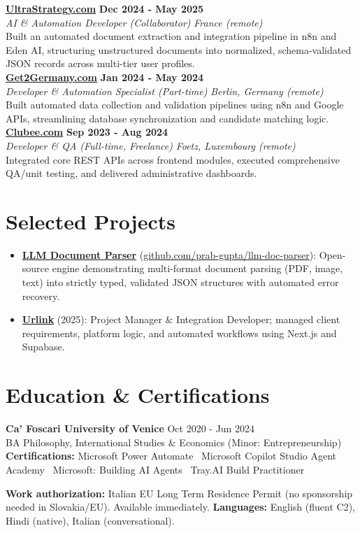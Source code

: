 \documentclass[a4paper,10pt]{article}
\newcommand{\role}[4]{%
  \textbf{#1} \hfill \textbf{#2}\\[1pt]%
  \textit{#3} \hfill \textit{#4}\\[2pt]%
}
\begin{document}
\role{\href{https://ultrastrategy.com}{UltraStrategy.com}}{Dec 2024 - May 2025}{AI \& Automation Developer (Collaborator)}{France (remote)}
Built an automated document extraction and integration pipeline in n8n and Eden AI, structuring unstructured documents into normalized, schema-validated JSON records across multi-tier user profiles.\\[1pt]

\role{\href{https://get2germany.com}{Get2Germany.com}}{Jan 2024 - May 2024}{Developer \& Automation Specialist (Part-time)}{Berlin, Germany (remote)}
Built automated data collection and validation pipelines using n8n and Google APIs, streamlining database synchronization and candidate matching logic.\\[1pt]

\role{\href{https://clubee.com}{Clubee.com}}{Sep 2023 - Aug 2024}{Developer \& QA (Full-time, Freelance)}{Foetz, Luxembourg (remote)}
Integrated core REST APIs across frontend modules, executed comprehensive QA/unit testing, and delivered administrative dashboards.

\section{Selected Projects}
\begin{itemize}
  \item \textbf{\href{https://github.com/prab-gupta/llm-doc-parser}{LLM Document Parser}} (\href{https://github.com/prab-gupta/llm-doc-parser}{github.com/prab-gupta/llm-doc-parser}): Open-source engine demonstrating multi-format document parsing (PDF, image, text) into strictly typed, validated JSON structures with automated error recovery.
  \item \textbf{\href{https://smarturlink.com/}{Urlink}} (2025): Project Manager \& Integration Developer; managed client requirements, platform logic, and automated workflows using Next.js and Supabase.
\end{itemize}

\section{Education \& Certifications}
\textbf{Ca' Foscari University of Venice} \hfill Oct 2020 - Jun 2024\\
BA Philosophy, International Studies \& Economics (Minor: Entrepreneurship)\\[1pt]
\textbf{Certifications:} Microsoft Power Automate \textbullet\ Microsoft Copilot Studio Agent Academy \textbullet\ Microsoft: Building AI Agents \textbullet\ Tray.AI Build Practitioner

\vspace{2pt}
{\small \textbf{Work authorization:} Italian EU Long Term Residence Permit (no sponsorship needed in Slovakia/EU). Available immediately. \quad \textbf{Languages:} English (fluent C2), Hindi (native), Italian (conversational).}
\end{document}
